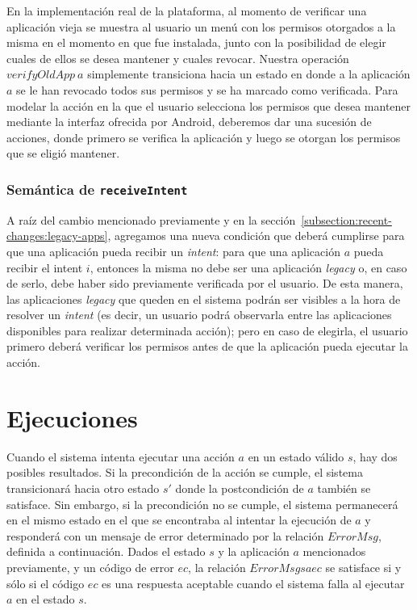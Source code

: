 En la implementación real de la plataforma, al momento de verificar una aplicación vieja se muestra
al usuario un menú con los permisos otorgados a la misma en el momento en que fue instalada, junto
con la posibilidad de elegir cuales de ellos se desea mantener y cuales revocar. Nuestra operación
$verifyOldApp\ a$ simplemente transiciona hacia un estado en donde a la aplicación $a$ se le han
revocado todos sus permisos y se ha marcado como verificada. Para modelar la acción en la que el
usuario selecciona los permisos que desea mantener mediante la interfaz ofrecida por Android,
deberemos dar una sucesión de acciones,  donde primero se verifica la aplicación y luego se otorgan
los permisos que se eligió mantener.

\subsubsection{Semántica de \texttt{receiveIntent}}

A raíz del cambio mencionado previamente y en la
sección~\ref{subsection:recent-changes:legacy-apps}, agregamos una nueva condición que deberá
cumplirse para que una aplicación pueda recibir un \textit{intent}: para que una aplicación $a$
pueda recibir el intent $i$, entonces la misma no debe ser una aplicación \textit{legacy} o, en caso
de serlo, debe haber sido previamente verificada por el usuario. De esta manera, las aplicaciones
\textit{legacy} que queden en el sistema podrán ser visibles a la hora de resolver un
\textit{intent} (es decir, un usuario podrá observarla entre las aplicaciones disponibles para
realizar determinada acción); pero en caso de elegirla, el usuario primero deberá verificar los
permisos antes de que la aplicación pueda ejecutar la acción.



\section{Ejecuciones}
Cuando el sistema intenta ejecutar una acción $a$ en un estado válido $s$, hay dos posibles
resultados. Si la precondición de la acción se cumple, el sistema transicionará hacia otro estado
$s'$ donde la postcondición de $a$ también se satisface. Sin embargo, si la precondición no se
cumple, el sistema permanecerá en el mismo estado en el que se encontraba al intentar la ejecución
de $a$ y responderá con un mensaje de error determinado por la relación $ErrorMsg$, definida a
continuación. Dados el estado $s$ y la aplicación $a$ mencionados previamente, y un código de error
$ec$, la relación $ErrorMsg s a ec$ se satisface si y sólo si el código $ec$ es una respuesta
aceptable cuando el sistema falla al ejecutar $a$ en el estado $s$.

